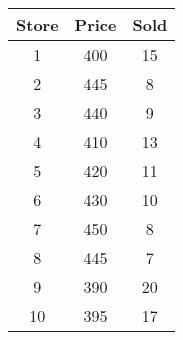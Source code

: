 \begin{tabular}{ccc}  \toprule
Store & Price & Sold \\\midrule
1     & 400   & 15   \\[6pt]
2     & 445   & 8    \\[6pt]
3     & 440   & 9    \\[6pt]
4     & 410   & 13   \\[6pt]
5     & 420   & 11   \\[6pt]
6     & 430   & 10   \\[6pt]
7     & 450   & 8    \\[6pt]
8     & 445   & 7    \\[6pt]
9     & 390   & 20   \\[6pt]
10    & 395   & 17   \\\bottomrule
\end{tabular}

